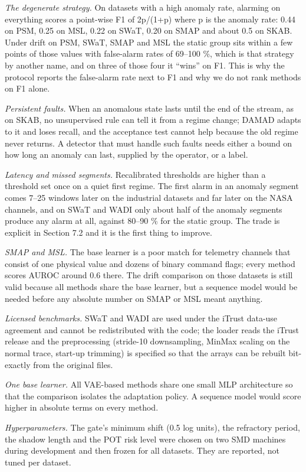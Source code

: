\emph{The degenerate strategy.} On datasets with a high anomaly rate, alarming on everything scores a point-wise F1 of 2p/(1+p) where p is the anomaly rate: 0.44 on PSM, 0.25 on MSL, 0.22 on SWaT, 0.20 on SMAP and about 0.5 on SKAB. Under drift on PSM, SWaT, SMAP and MSL the static group sits within a few points of those values with false-alarm rates of 69--100 \%, which is that strategy by another name, and on three of those four it ``wins'' on F1. This is why the protocol reports the false-alarm rate next to F1 and why we do not rank methods on F1 alone.

\emph{Persistent faults.} When an anomalous state lasts until the end of the stream, as on SKAB, no unsupervised rule can tell it from a regime change; DAMAD adapts to it and loses recall, and the acceptance test cannot help because the old regime never returns. A detector that must handle such faults needs either a bound on how long an anomaly can last, supplied by the operator, or a label.

\emph{Latency and missed segments.} Recalibrated thresholds are higher than a threshold set once on a quiet first regime. The first alarm in an anomaly segment comes 7--25 windows later on the industrial datasets and far later on the NASA channels, and on SWaT and WADI only about half of the anomaly segments produce any alarm at all, against 80--90 \% for the static group. The trade is explicit in Section 7.2 and it is the first thing to improve.

\emph{SMAP and MSL.} The base learner is a poor match for telemetry channels that consist of one physical value and dozens of binary command flags; every method scores AUROC around 0.6 there. The drift comparison on those datasets is still valid because all methods share the base learner, but a sequence model would be needed before any absolute number on SMAP or MSL meant anything.

\emph{Licensed benchmarks.} SWaT and WADI are used under the iTrust data-use agreement and cannot be redistributed with the code; the loader reads the iTrust release and the preprocessing (stride-10 downsampling, MinMax scaling on the normal trace, start-up trimming) is specified so that the arrays can be rebuilt bit-exactly from the original files.

\emph{One base learner.} All VAE-based methods share one small MLP architecture so that the comparison isolates the adaptation policy. A sequence model would score higher in absolute terms on every method.

\emph{Hyperparameters.} The gate's minimum shift (0.5 log units), the refractory period, the shadow length and the POT risk level were chosen on two SMD machines during development and then frozen for all datasets. They are reported, not tuned per dataset.

